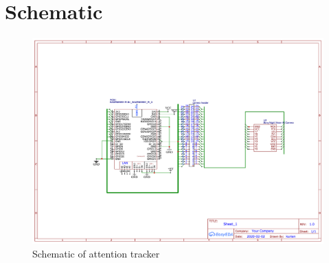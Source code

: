 \section{Schematic}
\begin{figure}[ht]
\centering
\includegraphics[scale=0.15]{project}
\caption{Schematic of attention tracker}
\end{figure}
